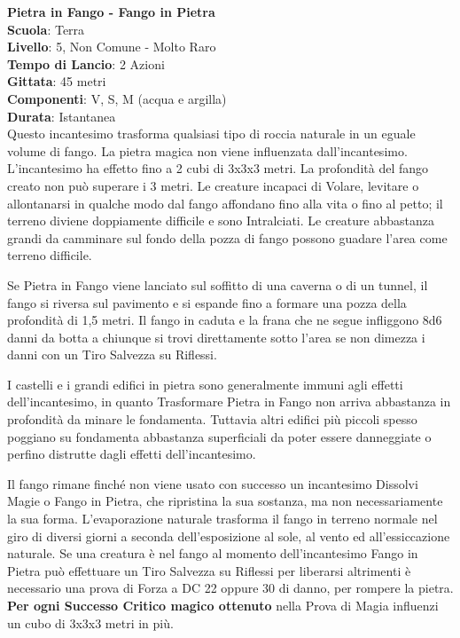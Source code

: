 \begin{multicols}{2}
\medskip\textbf{Pietra in Fango - Fango in Pietra}\\
\textbf{Scuola}: Terra\\
\textbf{Livello}: 5, Non Comune - Molto Raro\\
\textbf{Tempo di Lancio}: 2 Azioni\\
\textbf{Gittata}: 45 metri\\
\textbf{Componenti}: V, S, M (acqua e argilla)\\
\textbf{Durata}: Istantanea\\
Questo incantesimo trasforma qualsiasi tipo di roccia naturale in un eguale volume di fango. La pietra magica non viene influenzata dall'incantesimo. L'incantesimo ha effetto fino a 2 cubi di 3x3x3 metri. La profondità del fango creato non può superare i 3 metri. Le creature incapaci di Volare, levitare o allontanarsi in qualche modo dal fango affondano fino alla vita o fino al petto; il terreno diviene doppiamente difficile e sono Intralciati. Le creature abbastanza grandi da camminare sul fondo della pozza di fango possono guadare l'area come terreno difficile.

Se Pietra in Fango viene lanciato sul soffitto di una caverna o di un tunnel, il fango si riversa sul pavimento e si espande fino a formare una pozza della profondità di 1,5 metri. Il fango in caduta e la frana che ne segue infliggono 8d6 danni da botta a chiunque si trovi direttamente sotto l'area se non dimezza i danni con un Tiro Salvezza su Riflessi.

I castelli e i grandi edifici in pietra sono generalmente immuni agli effetti dell'incantesimo, in quanto Trasformare Pietra in Fango non arriva abbastanza in profondità da minare le fondamenta. Tuttavia altri edifici più piccoli spesso poggiano su fondamenta abbastanza superficiali da poter essere danneggiate o perfino distrutte dagli effetti dell'incantesimo.

Il fango rimane finché non viene usato con successo un incantesimo Dissolvi Magie o Fango in Pietra, che ripristina la sua sostanza, ma non necessariamente la sua forma. L'evaporazione naturale trasforma il fango in terreno normale nel giro di diversi giorni a seconda dell'esposizione al sole, al vento ed all'essiccazione naturale.
Se una creatura è nel fango al momento dell'incantesimo Fango in Pietra può effettuare un Tiro Salvezza su Riflessi per liberarsi altrimenti è necessario una prova di Forza a DC 22 oppure 30 di danno, per rompere la pietra.\\
\textbf{Per ogni Successo Critico magico ottenuto} nella Prova di Magia influenzi un cubo di 3x3x3 metri in più.


\end{multicols}
